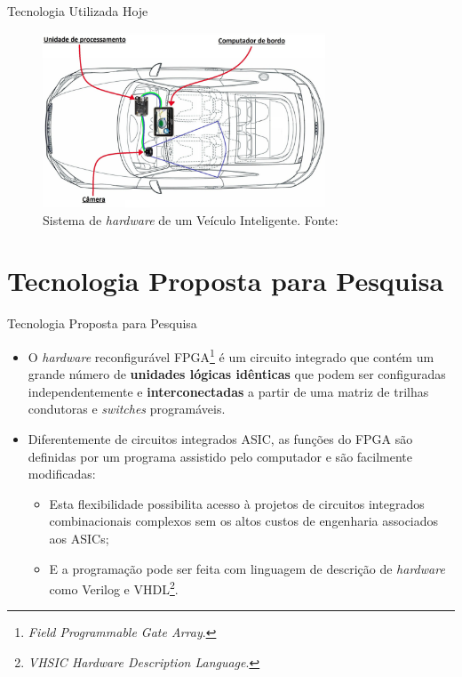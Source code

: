 \documentclass[aspectratio=169]{beamer}
\begin{document}
\begin{frame}{Tecnologia Utilizada Hoje}
	\begin{figure}[H]
		\centering
		\includegraphics[width=0.75\textwidth]{img/camera_motorista.png}
		\caption{Sistema de \textit{hardware} de um Veículo Inteligente. Fonte: \cite{kitt}}
		\label{fig:sistema}
	\end{figure}
\end{frame}



\section{Tecnologia Proposta para Pesquisa}

\begin{frame}{Tecnologia Proposta para Pesquisa}
	\begin{itemize}
		\item O \textit{hardware} reconfigurável FPGA\footnote{\textit{Field Programmable Gate Array}.} é um circuito integrado que contém um grande número de \textbf{unidades lógicas idênticas} que podem ser configuradas independentemente e \textbf{interconectadas} a partir de uma matriz de trilhas condutoras e \textit{switches} programáveis.
		
		\item Diferentemente de circuitos integrados ASIC, as funções do FPGA são definidas por um programa assistido pelo computador e são facilmente modificadas:
		
		\begin{itemize}
			\item Esta flexibilidade possibilita acesso à projetos de circuitos integrados combinacionais complexos sem os altos custos de engenharia associados aos ASICs;
			\item E a programação pode ser feita com linguagem de descrição de \textit{hardware} como Verilog e VHDL\footnote{\textit{VHSIC Hardware Description Language}.}.
		\end{itemize}
	\end{itemize}
\end{frame}
\end{document}

